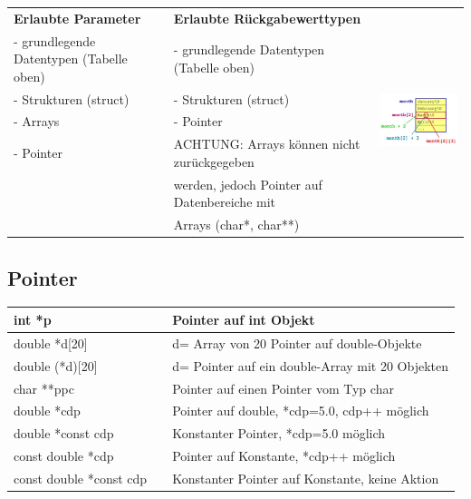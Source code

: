 \begin{tabular}{lll}
\textbf{Erlaubte Parameter} & \textbf{Erlaubte Rückgabewerttypen} & \multirow{7}{*}{\includegraphics[width=5cm]{C/Untitled}}\tabularnewline
- grundlegende Datentypen (Tabelle oben) & - grundlegende Datentypen (Tabelle oben) & \tabularnewline
- Strukturen (struct) & - Strukturen (struct) & \tabularnewline
- Arrays & - Pointer & \tabularnewline
\cline{2-2} 
\multicolumn{1}{l|}{- Pointer} & \multicolumn{1}{l|}{ACHTUNG: Arrays können nicht zurückgegeben} & \tabularnewline
\multicolumn{1}{l|}{} & \multicolumn{1}{l|}{werden, jedoch Pointer auf Datenbereiche mit} & \tabularnewline
\multicolumn{1}{l|}{} & \multicolumn{1}{l|}{Arrays (char{*}, char{*}{*})} & \tabularnewline
\cline{2-2} 
\end{tabular}


\subsection*{Pointer}

\begin{tabular}{|l|ll|}
\hline 
int {*}p &  & Pointer auf int Objekt\tabularnewline
\hline 
double {*}d{[}20{]} &  & d= Array von 20 Pointer auf double-Objekte\tabularnewline
\hline 
double ({*}d){[}20{]} &  & d= Pointer auf ein double-Array mit 20 Objekten\tabularnewline
\hline 
char {*}{*}ppc &  & Pointer auf einen Pointer vom Typ char\tabularnewline
\hline 
double {*}cdp &  & Pointer auf double, {*}cdp=5.0, cdp++ möglich\tabularnewline
\hline 
double {*}const cdp &  & Konstanter Pointer, {*}cdp=5.0 möglich\tabularnewline
\hline 
const double {*}cdp &  & Pointer auf Konstante, {*}cdp++ möglich\tabularnewline
\hline 
const double {*}const cdp &  & Konstanter Pointer auf Konstante, keine Aktion\tabularnewline
\hline 
\end{tabular}
